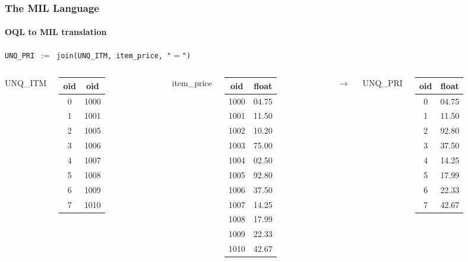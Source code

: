 \documentclass{beamer}
\begin{document}
\begin{frame}
  \frametitle{The MIL Language}
  \framesubtitle{OQL to MIL translation}

  \begin{block}{}
  {\tt UNQ\_PRI $:=$ join(UNQ\_ITM, item\_price, "$=$")}
  \end{block}

  \begin{columns}

  \column{2cm}

  UNQ\_ITM
  \begin{tabular}{|c|c|}
    \hline
    oid & oid \\
    \hline
    0 & 1000 \\
    1 & 1001 \\
    2 & 1005 \\
    3 & 1006 \\
    4 & 1007 \\
    5 & 1008 \\
    6 & 1009 \\
    7 & 1010 \\
    \hline
  \end{tabular}

  \column{1.5cm}

  item\_price
  \begin{tabular}{|c|c|}
    \hline
    oid & float \\
    \hline
    1000 & 04.75 \\
    1001 & 11.50 \\
    1002 & 10.20 \\
    1003 & 75.00 \\
    1004 & 02.50 \\
    1005 & 92.80 \\
    1006 & 37.50 \\
    1007 & 14.25 \\
    1008 & 17.99 \\
    1009 & 22.33 \\
    1010 & 42.67 \\
    \hline
  \end{tabular}

  \column{0.5cm}

  $\longrightarrow$

  \column{1cm}

  UNQ\_PRI
  \begin{tabular}{|c|c|}
    \hline
    oid & float \\
    \hline
    0 & 04.75 \\
    1 & 11.50 \\
    2 & 92.80 \\
    3 & 37.50 \\
    4 & 14.25 \\
    5 & 17.99 \\
    6 & 22.33 \\
    7 & 42.67 \\
    \hline
  \end{tabular}

  \end{columns}

\end{frame}
\end{document}
